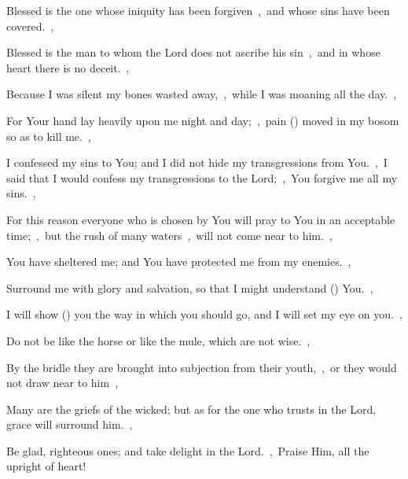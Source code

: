 \documentclass[12pt,twoside,a5paper]{article}
\begin{document}
\begin{normalparskip}
  Blessed is the one whose iniquity has been forgiven~\sep\ and whose sins have been covered.~\sep


  Blessed is the man to whom the Lord does not ascribe his sin~\sep\ and in whose heart there is no deceit.~\sep

  Because I was silent my bones wasted away,~\sep\ while I was moaning all the day.~\sep

  For Your hand lay heavily upon me night and day;~\sep\ pain () moved in my bosom so as to kill me.~\sep

  I confessed my sins to You; and I did not hide my transgressions from You.~\sep\ I said that I would confess my transgressions to the Lord;~\sep\ You forgive me all my sins.~\sep

  For this reason everyone who is chosen by You will pray to You in an acceptable time;~\sep\ but the rush of many waters~\sep\ will not come near to him.~\sep

  You have sheltered me; and You have protected me from my enemies.~\sep

  Surround me with glory and salvation, so that I might understand () You.~\sep

  I will show () you the way in which you should go, and I will set my eye on you.~\sep

  Do not be like the horse or like the mule, which are not wise.~\sep

  By the bridle they are brought into subjection from their youth,~\sep\ or they would not draw near to him~\sep

  Many are the griefs of the wicked; but as for the one who trusts in the Lord, grace will surround him.~\sep

  Be glad, righteous ones; and take delight in the Lord.~\sep\ Praise Him, all the upright of heart!
\end{normalparskip}



\end{document}
